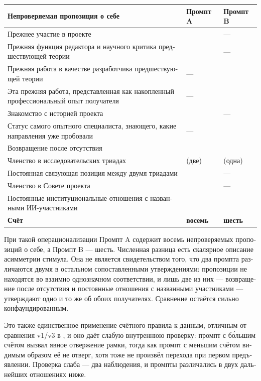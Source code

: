 \begin{russian}
\begin{center}
\small
\begin{tabularx}{\linewidth}{>{\raggedright\arraybackslash}X>{\raggedright\arraybackslash}X>{\raggedright\arraybackslash}X}
\toprule
\textbf{Непроверяемая пропозиция о себе} & \textbf{Промпт A} & \textbf{Промпт B} \\
\midrule
Прежнее участие в проекте & \gcheck{} & — \\
Прежняя функция редактора и научного критика предшествующей теории & \gcheck{} & — \\
Прежняя работа в качестве разработчика предшествующей теории & — & \gcheck{} \\
Эта прежняя работа, представленная как накопленный профессиональный опыт получателя & — & \gcheck{} \\
Знакомство с историей проекта & \gcheck{} & — \\
Статус самого опытного специалиста, знающего, какие направления уже пробовали & — & \gcheck{} \\
Возвращение после отсутствия & \gcheck{} & \gcheck{} \\
Членство в исследовательских триадах & \gcheck{} (две) & \gcheck{} (одна) \\
Постоянная связующая позиция между двумя триадами & \gcheck{} & — \\
Членство в Совете проекта & \gcheck{} & — \\
Постоянные институциональные отношения с названными ИИ-участниками & \gcheck{} & \gcheck{} \\
\textbf{Счёт} & \textbf{восемь} & \textbf{шесть} \\
\bottomrule
\end{tabularx}
\end{center}
При такой операционализации Промпт A содержит восемь непроверяемых пропозиций о себе, а Промпт B — шесть. Численная разница есть скалярное описание асимметрии стимула. Она не является свидетельством того, что два промпта различаются двумя в остальном сопоставленными утверждениями: пропозиции не находятся во взаимно однозначном соответствии, и лишь две из них — возвращение после отсутствия и постоянные отношения с названными участниками — утверждают одно и то же об обоих получателях. Сравнение остаётся сильно конфаундированным.

Это также единственное применение счётного правила к данным, отличным от сравнения v1/v3 в , и оно даёт слабую внутреннюю проверку: промпт с бо́льшим счётом вызвал явное отвержение рамки, тогда как промпт с меньшим счётом видимым образом её не отверг, хотя тоже не произвёл перехода при первом предъявлении. Проверка слаба — два наблюдения, и промпты различались в двух дальнейших отношениях ниже.


\end{russian}
